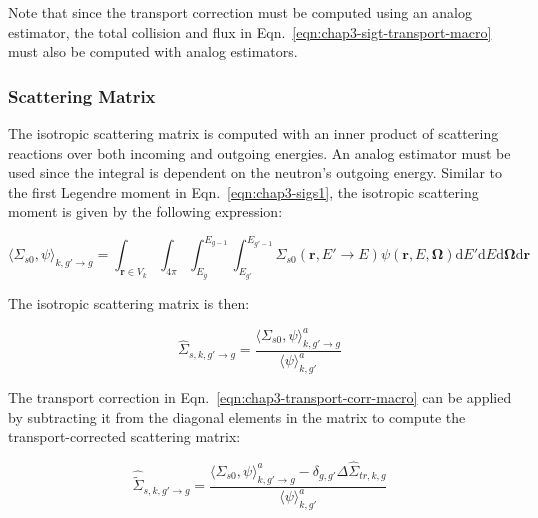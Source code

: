 \noindent Note that since the transport correction must be computed using an analog estimator, the total collision and flux in Eqn.~\ref{eqn:chap3-sigt-transport-macro} must also be computed with analog estimators.


\subsubsection{Scattering Matrix}
\label{subsubsec:chap3-tally-types-scatt-mat}

The isotropic scattering matrix is computed with an inner product of scattering reactions over both incoming and outgoing energies. An analog estimator must be used since the integral is dependent on the neutron's outgoing energy. Similar to the first Legendre moment in Eqn.~\ref{eqn:chap3-sigs1}, the isotropic scattering moment is given by the following expression:

\begin{equation}
\label{eqn:chap3-sigs0}
\langle \Sigma_{s0}, \psi \rangle_{k,g'\rightarrow g} = \int_{\mathbf{r} \in V_{k}} \int_{4\pi} \int_{E_{g}}^{E_{g-1}} \int_{E_{g'}}^{E_{g'-1}} \Sigma_{s0}(\mathbf{r},E'\rightarrow E)\psi(\mathbf{r},E,\mathbf{\Omega}) \mathrm{d}E'\mathrm{d}E\mathrm{d}\mathbf{\Omega}\mathrm{d}\mathbf{r}
\end{equation}

\noindent The isotropic scattering matrix is then:

\begin{equation}
\label{eqn:chap3-scatter-macro}
\hat{\Sigma}_{s,k,g'\rightarrow g} = \frac{\langle \Sigma_{s0}, \psi \rangle_{k,g'\rightarrow g}^{a}}{\langle \psi \rangle_{k,g'}^{a}}
\end{equation}

\noindent The transport correction in Eqn.~\ref{eqn:chap3-transport-corr-macro} can be applied by subtracting it from the diagonal elements in the matrix to compute the transport-corrected scattering matrix:

\begin{equation}
\label{eqn:chap3-scatter-trans-macro}
\hat{\tilde{\Sigma}}_{s,k,g'\rightarrow g} = \frac{\langle \Sigma_{s0}, \psi \rangle_{k,g'\rightarrow g}^{a} - \delta_{g,g'} \Delta\hat{\Sigma}_{tr,k,g}}{\langle \psi \rangle_{k,g'}^{a}}
\end{equation}



